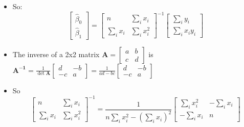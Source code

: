 \documentclass[11pt]{article}
\begin{document}
\begin{itemize}
\item So:%
\begin{equation*}
\begin{bmatrix}
\widehat{\beta }_{0} \\ 
\widehat{\beta }_{1}%
\end{bmatrix}%
=%
\begin{bmatrix}
n & \sum\nolimits_{i}x_{i} \\ 
\sum\nolimits_{i}x_{i} & \sum\nolimits_{i}x_{i}^{2}%
\end{bmatrix}%
^{-1}%
\begin{bmatrix}
\sum\nolimits_{i}y_{i} \\ 
\sum\nolimits_{i}x_{i}y_{i}%
\end{bmatrix}%
\end{equation*}

\item The inverse of a 2x2 matrix $\mathbf{A=}%
\begin{bmatrix}
a & b \\ 
c & d%
\end{bmatrix}%
$ is $\mathbf{A}^{\mathbf{-1}}=\frac{1}{\det \mathbf{A}}%
\begin{bmatrix}
d & -b \\ 
-c & a%
\end{bmatrix}%
=\frac{1}{ad-bc}%
\begin{bmatrix}
d & -b \\ 
-c & a%
\end{bmatrix}%
$

\item So 
\begin{equation*}
\begin{bmatrix}
n & \sum\nolimits_{i}x_{i} \\ 
\sum\nolimits_{i}x_{i} & \sum\nolimits_{i}x_{i}^{2}%
\end{bmatrix}%
^{-1}=\frac{1}{n\sum\nolimits_{i}x_{i}^{2}-\left(
\sum\nolimits_{i}x_{i}\right) ^{2}}%
\begin{bmatrix}
\sum\nolimits_{i}x_{i}^{2} & -\sum\nolimits_{i}x_{i} \\ 
-\sum\nolimits_{i}x_{i} & n%
\end{bmatrix}%
\end{equation*}


\end{itemize}
\end{document}
